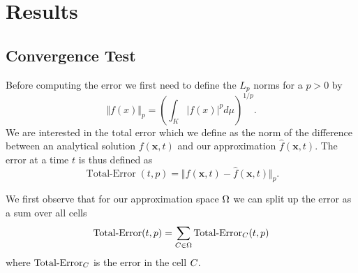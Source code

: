 \chapter{Results}\label{chap:results}
\section{Convergence Test}
\newcommand{\error}{\operatorname{Total-Error}}
Before computing the error we first need to define the $L_p$ norms for a $p > 0$ by
\begin{equation}
  \label{eq:Lp-nrom}
  \Vert f(x) \Vert_p = \left( \int_K \vert f(x) \vert^p d\mu  \right)^{1/p}.
\end{equation}
We are interested in the total error which we define as the norm of the difference between an analytical solution $f(\bm{x}, t)$ and our approximation $\hat{f}(\bm{x}, t)$.
The error at a time $t$ is thus defined as
\begin{equation}
  \label{eq:error}
  \error(t,p) = \Vert f(\bm{x}, t) - \hat{f}(\bm{x}, t) \Vert_p.
\end{equation}

We first observe that for our approximation space $\broken$ we can split up the error as a sum over all cells
\begin{equation}
  \label{eq:lp-norm-broken}
  \error(t,p) = \sum_{\cell[] \in \broken} \error_{\cell[]}(t,p)
\end{equation}
where $\error_{\cell[]}$ is the error in the cell $\cell[]$.



